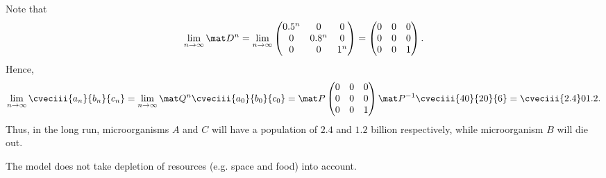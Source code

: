 \begin{solution}
\begin{ppart}
        Note that \[\lim_{n \to \infty} \mat D^n = \lim_{n \to \infty} \begin{pmatrix}0.5^n & 0 & 0 \\ 0 & 0.8^n & 0 \\ 0 & 0 & 1^n\end{pmatrix} = \begin{pmatrix}0 & 0 & 0 \\ 0 & 0 & 0 \\ 0 & 0 & 1\end{pmatrix}.\] Hence, \[\lim_{n \to \infty} \cveciii{a_n}{b_n}{c_n} = \lim_{n \to \infty} \mat Q^n \cveciii{a_0}{b_0}{c_0} = \mat P \begin{pmatrix}0 & 0 & 0 \\ 0 & 0 & 0 \\ 0 & 0 & 1\end{pmatrix} \mat P^{-1} \cveciii{40}{20}{6} = \cveciii{2.4}0{1.2}.\] Thus, in the long run, microorganisms $A$ and $C$ will have a population of $2.4$ and $1.2$ billion respectively, while microorganism $B$ will die out.
    \end{ppart}
    \begin{ppart}
        The model does not take depletion of resources (e.g. space and food) into account.
    \end{ppart}
\end{solution}